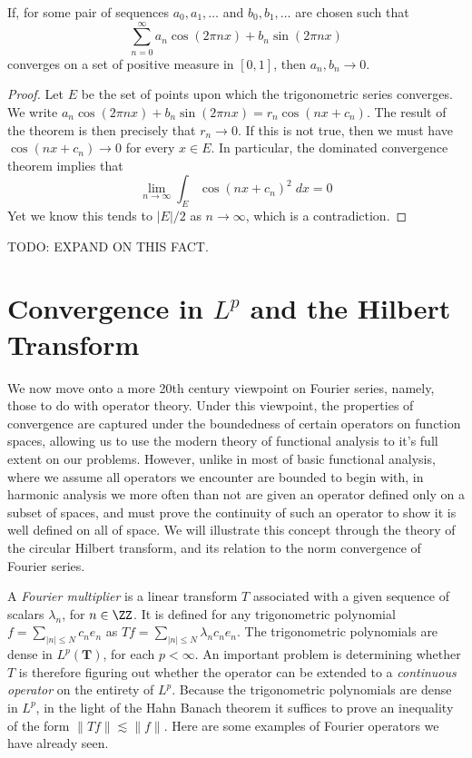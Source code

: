 \begin{theorem}
  If, for some pair of sequences $a_0, a_1, \dots$ and $b_0, b_1, \dots$ are chosen such that
  \[ \sum_{n = 0}^\infty a_n \cos(2 \pi nx) + b_n \sin(2 \pi nx) \]
  converges on a set of positive measure in $[0,1]$, then $a_n, b_n \to 0$.
\end{theorem}
\begin{proof}
  Let $E$ be the set of points upon which the trigonometric series converges. We write $a_n \cos(2 \pi n x) + b_n \sin(2 \pi n x) = r_n \cos(nx + c_n)$. The result of the theorem is then precisely that $r_n \to 0$. If this is not true, then we must have $\cos(nx + c_n) \to 0$ for every $x \in E$. In particular, the dominated convergence theorem implies that
  \[ \lim_{n \to \infty} \int_E \cos(nx + c_n)^2\; dx = 0 \]
  Yet we know this tends to $|E|/2$ as $n \to \infty$, which is a contradiction.
\end{proof}

TODO: EXPAND ON THIS FACT.






\section{Convergence in $L^p$ and the Hilbert Transform}

We now move onto a more 20th century viewpoint on Fourier series, namely, those to do with operator theory. Under this viewpoint, the properties of convergence are captured under the boundedness of certain operators on function spaces, allowing us to use the modern theory of functional analysis to it's full extent on our problems. However, unlike in most of basic functional analysis, where we assume all operators we encounter are bounded to begin with, in harmonic analysis we more often than not are given an operator defined only on a subset of spaces, and must prove the continuity of such an operator to show it is well defined on all of space. We will illustrate this concept through the theory of the circular Hilbert transform, and its relation to the norm convergence of Fourier series.

A \emph{Fourier multiplier} is a linear transform $T$ associated with a given sequence of scalars $\lambda_n$, for $n \in \ZZ$. It is defined for any trigonometric polynomial $f = \sum_{|n| \leq N} c_n e_n$ as $Tf = \sum_{|n| \leq N} \lambda_n c_n e_n$. The trigonometric polynomials are dense in $L^p(\mathbf{T})$, for each $p < \infty$. An important problem is determining whether $T$ is therefore figuring out whether the operator can be extended to a {\it continuous operator} on the entirety of $L^p$. Because the trigonometric polynomials are dense in $L^p$, in the light of the Hahn Banach theorem it suffices to prove an inequality of the form $\| Tf \| \lesssim \| f \|$. Here are some examples of Fourier operators we have already seen.

